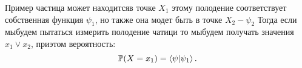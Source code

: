 Пример частица может находитсяв точке $X_1$ этому полодение соответствует 
 собственная функция $\psi_1$, но также она модет быть в точке $X_2 - \psi_2$ 
 Тогда если мыбудем пытаться измерить полодение чатици то мыбудем получать
 значения $x_1 \lor x_2$, приэтом вероятность: 
 \begin{equation} 
  \mathbb{P}(X = x_1) = \braket{\psi}{\psi_1}.
 \end{equation}

 









